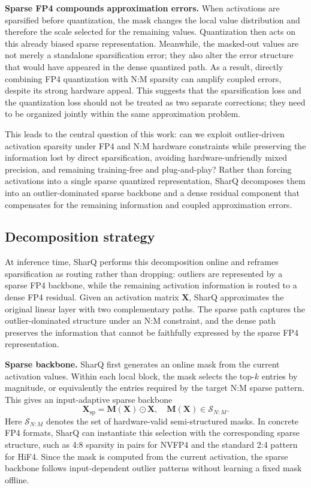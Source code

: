 \documentclass{article}
\begin{document}
\textbf{Sparse FP4 compounds approximation errors.}
When activations are sparsified before quantization, the mask changes the local
value distribution and therefore the scale selected for the remaining values.
Quantization then acts on this already biased sparse representation. Meanwhile,
the masked-out values are not merely a standalone sparsification error; they also
alter the error structure that would have appeared in the dense quantized path.
As a result, directly combining FP4 quantization with N:M sparsity can amplify
coupled errors, despite its strong hardware appeal. This suggests that the
sparsification loss and the quantization loss should not be treated as two
separate corrections; they need to be organized jointly within the same
approximation problem.

This leads to the central question of this work: can we exploit outlier-driven
activation sparsity under FP4 and N:M hardware constraints while preserving the
information lost by direct sparsification, avoiding hardware-unfriendly mixed
precision, and remaining training-free and plug-and-play? Rather than forcing
activations into a single sparse quantized representation, SharQ decomposes them
into an outlier-dominated sparse backbone and a dense residual component that
compensates for the remaining information and coupled approximation errors.

\subsection{Decomposition strategy}

At inference time, SharQ performs this decomposition online and reframes
sparsification as routing rather than dropping: outliers are represented by a
sparse FP4 backbone, while the remaining activation information is routed to a
dense FP4 residual. Given an activation matrix $\mathbf{X}$,
SharQ approximates the original linear layer with two complementary paths. The
sparse path captures the outlier-dominated structure under an N:M constraint,
and the dense path preserves the information that cannot be faithfully expressed
by the sparse FP4 representation.

\textbf{Sparse backbone.}
SharQ first generates an online mask from the current activation values. Within
each local block, the mask selects the top-$k$ entries by magnitude, or
equivalently the entries required by the target N:M sparse pattern. This gives an
input-adaptive sparse backbone
\begin{equation}
  \mathbf{X}_{\mathrm{sp}}
  =
  \mathbf{M}(\mathbf{X}) \odot \mathbf{X},
  \quad
  \mathbf{M}(\mathbf{X}) \in \mathcal{S}_{N:M}.
  \label{eq:sharq-sparse-backbone}
\end{equation}
Here $\mathcal{S}_{N:M}$ denotes the set of hardware-valid semi-structured
masks. In concrete FP4 formats, SharQ can instantiate this selection with the
corresponding sparse structure, such as 4:8 sparsity in pairs for NVFP4 and the
standard 2:4 pattern for HiF4. Since the mask is computed from the current
activation, the sparse backbone follows input-dependent outlier patterns without
learning a fixed mask offline.
\end{document}
